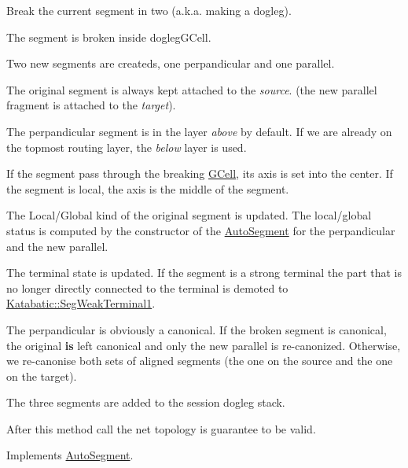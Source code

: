 Break the current segment in two (a.\+k.\+a. making a dogleg).
\begin{DoxyItemize}
\item The segment is broken inside {\ttfamily dogleg\+G\+Cell}.
\item Two new segments are createds, one perpandicular and one parallel.
\item The original segment is always kept attached to the {\itshape source}. (the new parallel fragment is attached to the {\itshape target}).
\item The perpandicular segment is in the layer {\itshape above} by default. If we are already on the topmost routing layer, the {\itshape below} layer is used.
\item If the segment pass through the breaking \mbox{\hyperlink{classKatabatic_1_1GCell}{G\+Cell}}, it\textquotesingle{}s axis is set into the center. If the segment is local, the axis is the middle of the segment.
\item The Local/\+Global kind of the original segment is updated. The local/global status is computed by the constructor of the \mbox{\hyperlink{classKatabatic_1_1AutoSegment}{Auto\+Segment}} for the perpandicular and the new parallel.
\item The terminal state is updated. If the segment is a strong terminal the part that is no longer directly connected to the terminal is demoted to \mbox{\hyperlink{namespaceKatabatic_a94585537ee1724ea9315578ec54380f4a7b3e09b8ab4cf676fd308535d7fba892}{Katabatic\+::\+Seg\+Weak\+Terminal1}}.
\item The perpandicular is obviously a canonical. If the broken segment is canonical, the original {\bfseries is} left canonical and only the new parallel is re-\/canonized. Otherwise, we re-\/canonise both sets of aligned segments (the one on the source and the one on the target).
\item The three segments are added to the session dogleg stack.
\end{DoxyItemize}

After this method call the net topology is guarantee to be valid.

  

Implements \mbox{\hyperlink{classKatabatic_1_1AutoSegment_a37a14b40295ccb50cd5001891385807b}{Auto\+Segment}}.




